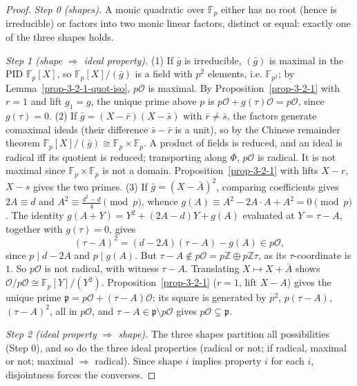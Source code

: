 \begin{proof}
  \emph{Step 0 (shapes).} A monic quadratic over $\mathbb{F}_p$ either has
  no root (hence is irreducible) or factors into two monic linear factors,
  distinct or equal: exactly one of the three shapes holds.

  \emph{Step 1 (shape $\Rightarrow$ ideal property).}
  (1) If $\bar g$ is irreducible, $(\bar g)$ is maximal in the PID
  $\mathbb{F}_p[X]$, so $\mathbb{F}_p[X]/(\bar g)$ is a field with $p^2$
  elements, i.e. $\mathbb{F}_{p^2}$; by Lemma~\ref{prop-3-2-1-quot-iso},
  $p\mathcal{O}$ is maximal. By Proposition~\ref{prop-3-2-1} with $r = 1$
  and lift $g_1 = g$, the unique prime above $p$ is $p\mathcal{O} +
  g(\tau)\mathcal{O} = p\mathcal{O}$, since $g(\tau) = 0$.
  (2) If $\bar g = (X - \bar r)(X - \bar s)$ with $\bar r \neq \bar s$, the
  factors generate comaximal ideals (their difference $\bar s - \bar r$ is a
  unit), so by the Chinese remainder theorem $\mathbb{F}_p[X]/(\bar g) \cong
  \mathbb{F}_p \times \mathbb{F}_p$. A product of fields is reduced, and an
  ideal is radical iff its quotient is reduced; transporting along $\Phi$,
  $p\mathcal{O}$ is radical. It is not maximal since $\mathbb{F}_p \times
  \mathbb{F}_p$ is not a domain. Proposition~\ref{prop-3-2-1} with lifts
  $X - r$, $X - s$ gives the two primes.
  (3) If $\bar g = (X - \bar A)^2$, comparing coefficients gives
  $2A \equiv d$ and $A^2 \equiv \tfrac{d^2 - d}{4} \pmod p$, whence
  $g(A) \equiv A^2 - 2A \cdot A + A^2 = 0 \pmod p$. The identity
  $g(A + Y) = Y^2 + (2A - d)Y + g(A)$ evaluated at $Y = \tau - A$, together
  with $g(\tau) = 0$, gives
  \[
    (\tau - A)^2 = (d - 2A)(\tau - A) - g(A) \in p\mathcal{O},
  \]
  since $p \mid d - 2A$ and $p \mid g(A)$. But $\tau - A \notin p\mathcal{O}
  = p\mathbb{Z} \oplus p\mathbb{Z}\tau$, as its $\tau$-coordinate is $1$.
  So $p\mathcal{O}$ is not radical, with witness $\tau - A$. Translating
  $X \mapsto X + \bar A$ shows $\mathcal{O}/p\mathcal{O} \cong
  \mathbb{F}_p[Y]/(Y^2)$. Proposition~\ref{prop-3-2-1} ($r = 1$, lift
  $X - A$) gives the unique prime $\mathfrak{p} = p\mathcal{O} +
  (\tau - A)\mathcal{O}$; its square is generated by $p^2$, $p(\tau - A)$,
  $(\tau - A)^2$, all in $p\mathcal{O}$, and $\tau - A \in \mathfrak{p}
  \setminus p\mathcal{O}$ gives $p\mathcal{O} \subsetneq \mathfrak{p}$.

  \emph{Step 2 (ideal property $\Rightarrow$ shape).} The three shapes
  partition all possibilities (Step 0), and so do the three ideal properties
  (radical or not; if radical, maximal or not; maximal $\Rightarrow$
  radical). Since shape $i$ implies property $i$ for each $i$, disjointness
  forces the converses.


\end{proof}
